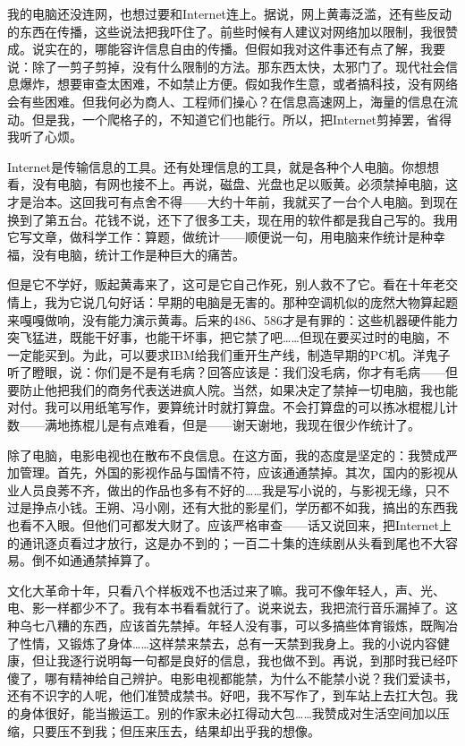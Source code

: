 我的电脑还没连网，也想过要和Internet连上。据说，网上黄毒泛滥，还有些反动的东西在传播，这些说法把我吓住了。前些时候有人建议对网络加以限制，我很赞成。说实在的，哪能容许信息自由的传播。但假如我对这件事还有点了解，我要说：除了一剪子剪掉，没有什么限制的方法。那东西太快，太邪门了。现代社会信息爆炸，想要审查太困难，不如禁止方便。假如我作生意，或者搞科技，没有网络会有些困难。但我何必为商人、工程师们操心？在信息高速网上，海量的信息在流动。但是我，一个爬格子的，不知道它们也能行。所以，把Internet剪掉罢，省得我听了心烦。 

Internet是传输信息的工具。还有处理信息的工具，就是各种个人电脑。你想想看，没有电脑，有网也接不上。再说，磁盘、光盘也足以贩黄。必须禁掉电脑，这才是治本。这回我可有点舍不得——大约十年前，我就买了一台个人电脑。到现在换到了第五台。花钱不说，还下了很多工夫，现在用的软件都是我自己写的。我用它写文章，做科学工作：算题，做统计——顺便说一句，用电脑来作统计是种幸福，没有电脑，统计工作是种巨大的痛苦。 

但是它不学好，贩起黄毒来了，这可是它自己作死，别人救不了它。看在十年老交情上，我为它说几句好话：早期的电脑是无害的。那种空调机似的庞然大物算起题来嘎嘎做响，没有能力演示黄毒。后来的486、586才是有罪的：这些机器硬件能力突飞猛进，既能干好事，也能干坏事，把它禁了吧……但现在要买过时的电脑，不一定能买到。为此，可以要求IBM给我们重开生产线，制造早期的PC机。洋鬼子听了瞪眼，说：你们是不是有毛病？回答应该是：我们没毛病，你才有毛病——但要防止他把我们的商务代表送进疯人院。当然，如果决定了禁掉一切电脑，我也能对付。我可以用纸笔写作，要算统计时就打算盘。不会打算盘的可以拣冰棍棍儿计数——满地拣棍儿是有点难看，但是——谢天谢地，我现在很少作统计了。 

除了电脑，电影电视也在散布不良信息。在这方面，我的态度是坚定的：我赞成严加管理。首先，外国的影视作品与国情不符，应该通通禁掉。其次，国内的影视从业人员良莠不齐，做出的作品也多有不好的……我是写小说的，与影视无缘，只不过是挣点小钱。王朔、冯小刚，还有大批的影星们，学历都不如我，搞出的东西我也看不入眼。但他们可都发大财了。应该严格审查——话又说回来，把Internet上的通讯逐贞看过才放行，这是办不到的；一百二十集的连续剧从头看到尾也不大容易。倒不如通通禁掉算了。 

文化大革命十年，只看八个样板戏不也活过来了嘛。我可不像年轻人，声、光、电、影一样都少不了。我有本书看看就行了。说来说去，我把流行音乐漏掉了。这种乌七八糟的东西，应该首先禁掉。年轻人没有事，可以多搞些体育锻炼，既陶冶了性情，又锻炼了身体……这样禁来禁去，总有一天禁到我身上。我的小说内容健康，但让我逐行说明每一句都是良好的信息，我也做不到。再说，到那时我已经吓傻了，哪有精神给自己辨护。电影电视都能禁，为什么不能禁小说？我们爱读书，还有不识字的人呢，他们准赞成禁书。好吧，我不写作了，到车站上去扛大包。我的身体很好，能当搬运工。别的作家未必扛得动大包……我赞成对生活空间加以压缩，只要压不到我；但压来压去，结果却出乎我的想像。 

